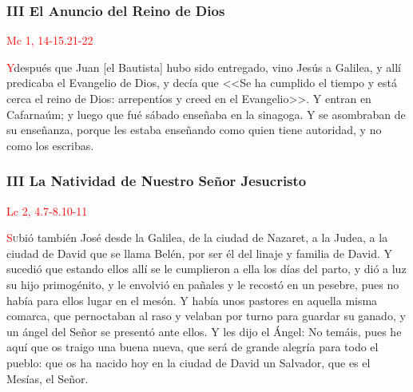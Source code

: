 \documentclass[10pt,twoside]{book}
\begin{document}
\begin{paracol}{2}
      \begin{leftcolumn}

            \noindent\subsubsection*{III El Anuncio del Reino de Dios}
            
            \vspace{-0.5em}

            \hfill\textcolor{red}{Mc 1, 14-15.21-22}

            \lettrine[lines=2]{\textcolor{red}{Y}}\space después que Juan [el Bautista] hubo sido entregado, vino Jesús a Galilea, y allí predicaba el Evangelio de Dios, y decía que <<Se ha cumplido
            el tiempo y está cerca el reino de Dios: arrepentíos y creed en el Evangelio>>. Y entran en Cafarnaúm; y luego que fué sábado enseñaba en la sinagoga. Y se asombraban de su
            enseñanza, porque les estaba enseñando como quien tiene autoridad, y no como los escribas.

      \end{leftcolumn}
      \begin{rightcolumn}
            \noindent\subsubsection*{III La Natividad de Nuestro Señor Jesucristo}

            \vspace{-0.5em}

            \hfill\textcolor{red}{Lc 2, 4.7-8.10-11}

            \lettrine[lines=2]{\textcolor{red}{S}}ubió también José desde la Galilea, de la ciudad de Nazaret, a la Judea, a la ciudad de David que se llama Belén, por ser él del linaje y familia de David.
            Y sucedió que estando ellos allí se le cumplieron a ella los días del parto, y dió a luz su hijo primogénito, y le envolvió en pañales y le recostó en un pesebre, 
            pues no había para ellos lugar en el mesón. Y había unos pastores en aquella misma comarca, que pernoctaban al raso y velaban por turno para guardar su ganado, 
            y un ángel del Señor se presentó ante ellos. Y les dijo el Ángel: No temáis, pues he aquí que os traigo una buena nueva, que será de grande alegría para todo el pueblo: 
            que os ha nacido hoy en la ciudad de David un Salvador, que es el Mesías, el Señor.
      \end{rightcolumn}
\end{paracol}
\end{document}
